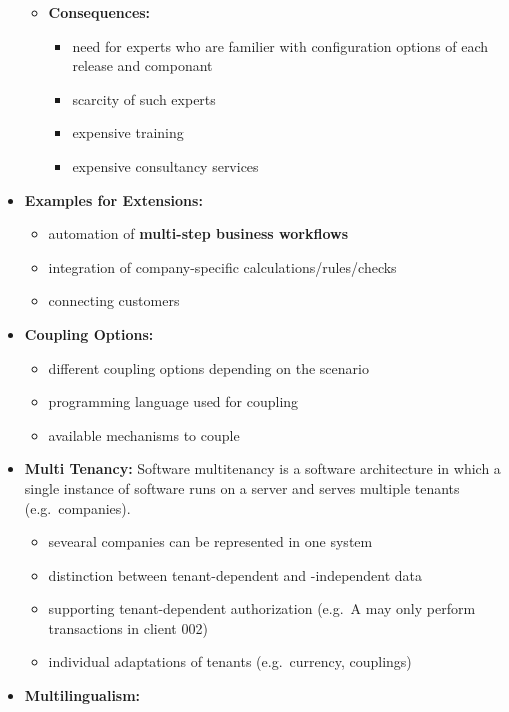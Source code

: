 \documentclass[ieeetran]{article}
\begin{document}
\begin{itemize}
\begin{itemize}
\begin{itemize}
			  \end{itemize}
		  \item \textbf{Consequences:} 
				  \begin{itemize}
				    \item need for experts who are familier with configuration options of each release and componant
					   \item scarcity of such experts
						   \item expensive training
							   \item expensive consultancy services
				  \end{itemize}
		\end{itemize}

\item \textbf{Examples for Extensions:}
	\begin{itemize}
	  \item automation of \textbf{multi-step business workflows}
	\item integration of company-specific calculations/rules/checks
	\item connecting customers
	\end{itemize}
\item \textbf{Coupling Options:}
	\begin{itemize}
	  \item different coupling options depending on the scenario
	\item programming language used for coupling
	\item available mechanisms to couple
	\end{itemize}

\item \textbf{Multi Tenancy:} Software multitenancy is a software architecture in which a single instance of software runs on a server and serves multiple tenants (e.g.\ companies).
	\begin{itemize}
	  \item sevearal companies can be represented in one system
	\item distinction between tenant-dependent and -independent data
	\item supporting tenant-dependent authorization (e.g.\ A may only perform transactions in client 002)
         \item individual adaptations of tenants (e.g.\ currency, couplings)
	\end{itemize}

\item \textbf{Multilingualism:}


\end{itemize}
\end{document}
